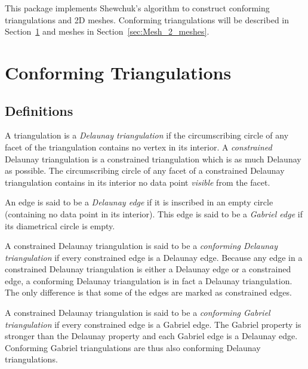 \label{user_chapter_2D_Meshes}




\minitoc

This package implements Shewchuk's algorithm \cite{s-mgdsa-00} to construct
conforming triangulations and 2D meshes. Conforming triangulations will be
described in Section~\ref{sec:Mesh_2_conforming_triangulation} and
meshes in Section~\ref{sec:Mesh_2_meshes}.

\section{Conforming Triangulations}
\label{sec:Mesh_2_conforming_triangulation}

\subsection{Definitions}
\label{sec:Mesh_2_conforming_definitions}

A triangulation is a \emph{Delaunay triangulation} if the circumscribing
circle of any facet of the triangulation contains no vertex in its
interior. A \emph{constrained} Delaunay triangulation is a constrained
triangulation which is as much Delaunay as possible. The circumscribing
circle of any facet of a constrained Delaunay triangulation contains in its
interior no data point \emph{visible} from the facet.

An edge is said to be a \emph{Delaunay edge} if it is inscribed in an empty
circle (containing no data point in its interior). This edge is said to be a
\emph{Gabriel edge} if its diametrical circle is empty.

A constrained Delaunay triangulation is said to be a \emph{conforming
  Delaunay triangulation} if every constrained edge is a Delaunay edge.
Because any edge in a constrained Delaunay triangulation is either a
Delaunay edge or a constrained edge, a conforming Delaunay triangulation is
in fact a Delaunay triangulation. The only difference is that some of the
edges are marked as constrained edges.

A constrained Delaunay triangulation is said to be a \emph{conforming
  Gabriel triangulation} if every constrained edge is a Gabriel edge. The
Gabriel property is stronger than the Delaunay property and each Gabriel
edge is a Delaunay edge. Conforming Gabriel triangulations are thus also
conforming Delaunay triangulations.

